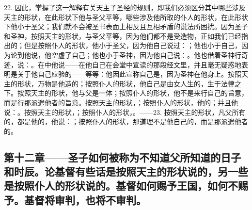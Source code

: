22. 因此，掌握了这一解释有关天主子圣经的规则，即我们必须区分其中哪些涉及天主的形状，在此形状下他与圣父平等，哪些涉及他所取的仆人的形状，在此形状下他小于圣父；我们就不会被圣书表面上相反且互相矛盾的说法所困扰。因为圣子和圣神，按照天主的形状，与圣父平等，因为他们都不是受造物，正如我们已经指出的；但是按照仆人的形状，他小于圣父，因为他自己说过：；他也小于自己，因为论到他说，他空虚了自己；他也小于圣神，因为他自己说：。他也借着圣神行奇迹，说：。在中他说——在他自己在会堂中宣读的那段经文里，并且毫无疑惑地表明是关于他自己应验的——等等：他因此宣称自己是，因为圣神在他身上。按照天主的形状，万物是他造的；按照仆人的形状，他自己是由女人生的，生于法律之下。按照天主的形状，他与父是一体；按照仆人的形状，他不是来行自己的旨意，而是行那派遣他者的旨意。按照天主的形状，；按照仆人的形状，他的；并且他说：。按照天主的形状，；按照仆人的形状，。——23. 按照天主的形状，凡父所有的，都是他的，他说：；按照仆人的形状，那道理不是他自己的，而是那派遣他者的。\par


\subsection{第十二章——圣子如何被称为不知道父所知道的日子和时辰。论基督有些话是按照天主的形状说的，另一些是按照仆人的形状说的。基督如何赐予王国，如何不赐予。基督将审判，也将不审判。}

